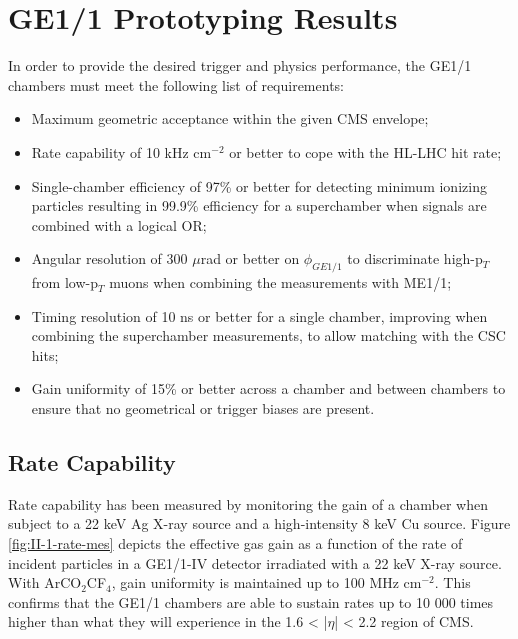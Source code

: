   \section{GE1/1 Prototyping Results}

    In order to provide the desired trigger and physics performance, the GE1/1 chambers must meet the following list of requirements:
    \begin{itemize}
      \item Maximum geometric acceptance within the given CMS envelope;
      \item Rate capability of 10 kHz cm$^{-2}$ or better to cope with the HL-LHC hit rate;
      \item Single-chamber efficiency of 97\% or better for detecting minimum ionizing particles resulting in 99.9\% efficiency for a superchamber when signals are combined with a logical OR;
      \item Angular resolution of 300 $\mu$rad or better on $ \phi_{GE1/1} $ to discriminate high-p$_T$ from low-p$_T$ muons when combining the measurements with ME1/1;
      \item Timing resolution of 10 ns or better for a single chamber, improving when combining the superchamber measurements, to allow matching with the CSC hits;
      \item Gain uniformity of 15\% or better across a chamber and between chambers to ensure that no geometrical or trigger biases are present. \\
    \end{itemize}

    \subsection{Rate Capability}

      Rate capability has been measured by monitoring the gain of a chamber when subject to a 22 keV Ag X-ray source and a high-intensity 8 keV Cu source. Figure \ref{fig:II-1-rate-mes} depicts the effective gas gain as a function of the rate of incident particles in a GE1/1-IV detector irradiated with a 22 keV X-ray source. With ArCO$_2$CF$_4$, gain uniformity is maintained up to 100 MHz cm$^{-2}$. This confirms that the GE1/1 chambers are able to sustain rates up to 10 000 times higher than what they will experience in the 1.6 < |$\eta$| < 2.2 region of CMS. \\

